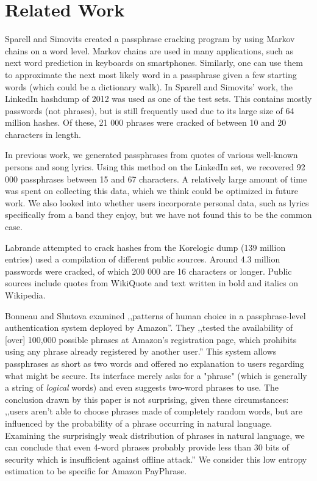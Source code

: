 \documentclass{article}
\begin{document}
\section{Related Work}

Sparell and Simovits\cite{sparell-simovits} created a passphrase cracking
program by using Markov chains on a word level. Markov chains are used in many
applications, such as next word prediction in keyboards on smartphones.
Similarly, one can use them to approximate the next most likely word in a
passphrase given a few starting words (which could be a dictionary walk). In
Sparell and Simovits' work, the LinkedIn hashdump of 2012 was used as one of
the test sets. This contains mostly passwords (not phrases), but is still
frequently used due to its large size of 64 million hashes. Of these, 21 000
phrases were cracked of between 10 and 20 characters in length.

In previous work, we\cite{own} generated passphrases from quotes of various
well-known persons and song lyrics. Using this method on the LinkedIn set, we
recovered 92 000 passphrases between 15 and 67 characters. A relatively large
amount of time was spent on collecting this data, which we think could be
optimized in future work. We also looked into whether users incorporate
personal data, such as lyrics specifically from a band they enjoy, but we have
not found this to be the common case.

Labrande\cite{crackmeimfamous} attempted to crack hashes from the Korelogic
dump (139 million entries) used a compilation of different public sources.
Around 4.3 million passwords were cracked, of which 200 000 are 16 characters
or longer. Public sources include quotes from WikiQuote and text written in
bold and italics on Wikipedia.

Bonneau and Shutova\cite{payphrase-properties} examined ,,patterns of human
choice in a passphrase-level authentication system deployed by Amazon''. They
,,tested the availability of [over] 100,000 possible phrases at Amazon's
registration page, which prohibits using any phrase already registered by
another user.'' This system allows passphrases as short as two words and
offered no explanation to users regarding what might be secure. Its interface
merely asks for a "phrase" (which is generally a string of {\it logical} words)
and even suggests two-word phrases to use. The conclusion drawn by this paper
is not surprising, given these circumstances: ,,users aren’t able to choose
phrases made of completely random words, but are influenced by the probability
of a phrase occurring in natural language. Examining the surprisingly weak
distribution of phrases in natural language, we can conclude that even 4-word
phrases probably provide less than 30 bits of security which is insufficient
against offline attack.'' We consider this low entropy estimation to be
specific for Amazon PayPhrase.
\end{document}
